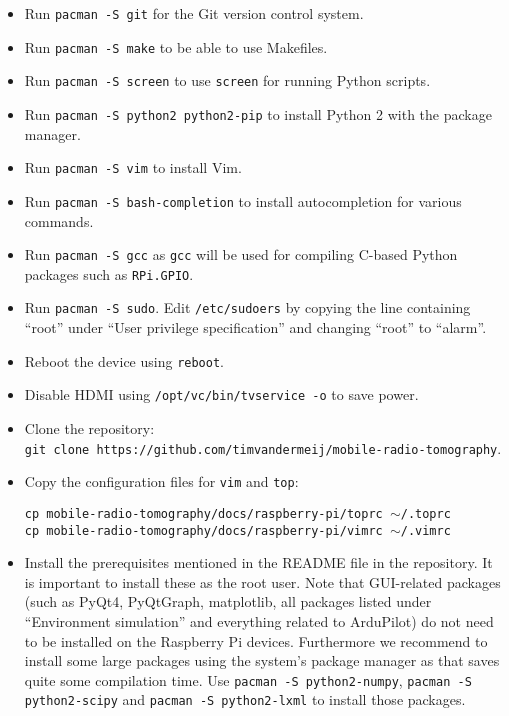 \documentclass{article}
\begin{document}
\begin{itemize}
    \item Run {\tt pacman -S git} for the Git version control system.
    \item Run {\tt pacman -S make} to be able to use Makefiles.
    \item Run {\tt pacman -S screen} to use {\tt screen} for running Python
          scripts.
    \item Run {\tt pacman -S python2 python2-pip} to install Python 2 with the 
          package manager.
    \item Run {\tt pacman -S vim} to install Vim.
    \item Run {\tt pacman -S bash-completion} to install autocompletion for 
          various commands.
    \item Run {\tt pacman -S gcc} as {\tt gcc} will be used for compiling 
          C-based Python packages such as {\tt RPi.GPIO}.
    \item Run {\tt pacman -S sudo}. Edit {\tt /etc/sudoers} by copying the line 
          containing ``root'' under ``User privilege specification'' and 
          changing ``root'' to ``alarm''.
    \item Reboot the device using {\tt reboot}.
    \item Disable HDMI using {\tt /opt/vc/bin/tvservice -o} to save power.
    \item Clone the repository: \\ {\tt git clone 
          https://github.com/timvandermeij/mobile-radio-tomography}.
    \item Copy the configuration files for {\tt vim} and {\tt top}:
        
          {\tt cp mobile-radio-tomography/docs/raspberry-pi/toprc 
          $\sim$/.toprc} \\
          {\tt cp mobile-radio-tomography/docs/raspberry-pi/vimrc 
          $\sim$/.vimrc}
    \item Install the prerequisites mentioned in the README file in the 
          repository. It is important to install these as the root user. Note 
          that GUI-related packages (such as PyQt4, PyQtGraph, matplotlib, all 
          packages listed under ``Environment simulation'' and everything 
          related to ArduPilot) do not need to be installed on the Raspberry Pi 
          devices. Furthermore we recommend to install some large packages 
          using the system's package manager as that saves quite some 
          compilation time. Use {\tt pacman -S python2-numpy}, {\tt pacman -S 
          python2-scipy} and {\tt pacman -S python2-lxml} to install those 
          packages.
\end{itemize}
\end{document}
